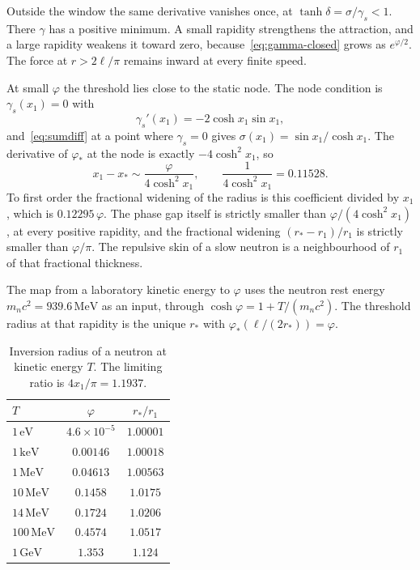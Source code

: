 \documentclass[a4paper]{article}
\begin{document}
Outside the window the same derivative vanishes once, at \(\tanh\delta=\sigma/\gamma_s<1\). There \(\gamma\) has a positive minimum. A small rapidity strengthens the attraction, and a large rapidity weakens it toward zero, because~\eqref{eq:gamma-closed} grows as \(e^{\varphi/2}\). The force at \(r>2\ell/\pi\) remains inward at every finite speed.

At small \(\varphi\) the threshold lies close to the static node. The node condition is \(\gamma_s(x_1)=0\) with
\[
\gamma_s'(x_1)=-2\cosh x_1\sin x_1,
\]
and~\eqref{eq:sumdiff} at a point where \(\gamma_s=0\) gives \(\sigma(x_1)=\sin x_1/\cosh x_1\). The derivative of \(\varphi_*\) at the node is exactly \(-4\cosh^{2}x_1\), so
\begin{equation}
\label{eq:skin}
x_1-x_*
  \sim
  \frac{\varphi}{4\cosh^{2}x_1},
\qquad
\frac{1}{4\cosh^{2}x_1}=0.11528.
\end{equation}
To first order the fractional widening of the radius is this coefficient divided by \(x_1\), which is \(0.12295\,\varphi\). The phase gap itself is strictly smaller than \(\varphi/(4\cosh^{2}x_{1})\), at every positive rapidity, and the fractional widening \((r_{*}-r_{1})/r_{1}\) is strictly smaller than \(\varphi/\pi\). The repulsive skin of a slow neutron is a neighbourhood of \(r_1\) of that fractional thickness.

The map from a laboratory kinetic energy to \(\varphi\) uses the neutron rest energy \(m_n c^{2}=939.6\,\mathrm{MeV}\) as an input, through \(\cosh\varphi=1+T/(m_n c^{2})\). The threshold radius at that rapidity is the unique \(r_*\) with \(\varphi_*( \ell/(2r_*) )=\varphi\).

\begin{table}[htbp]
\centering
\caption{Inversion radius of a neutron at kinetic energy \(T\). The limiting ratio is \(4x_1/\pi=1.1937\).}
\label{tab:neutron}
\begin{tabular}{lcc}
\hline
\(T\) & \(\varphi\) & \(r_*/r_1\) \\
\hline
\(1\,\mathrm{eV}\) & \(4.6\times 10^{-5}\) & \(1.00001\) \\
\(1\,\mathrm{keV}\) & \(0.00146\) & \(1.00018\) \\
\(1\,\mathrm{MeV}\) & \(0.04613\) & \(1.00563\) \\
\(10\,\mathrm{MeV}\) & \(0.1458\) & \(1.0175\) \\
\(14\,\mathrm{MeV}\) & \(0.1724\) & \(1.0206\) \\
\(100\,\mathrm{MeV}\) & \(0.4574\) & \(1.0517\) \\
\(1\,\mathrm{GeV}\) & \(1.353\) & \(1.124\) \\
\hline
\end{tabular}
\end{table}
\end{document}
